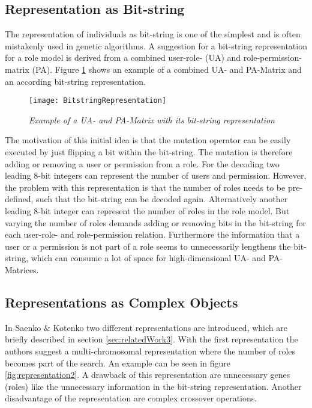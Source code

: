         \subsection{Representation as Bit-string}
        The representation of individuals as bit-string is one of the simplest and is often mistakenly used in genetic algorithms\cite{Eiben}. A suggestion for a bit-string representation for a role model is derived from a combined user-role- (UA) and role-permission-matrix (PA). Figure \ref{fig:representation1} shows an example of a combined UA- and PA-Matrix and an according bit-string representation.
        
        \begin{figure}[H]
            \centering
            \texttt{[image: BitstringRepresentation]}
            \caption{\textit{Example of a UA- and PA-Matrix with its bit-string representation}}
            \label{fig:representation1}
        \end{figure}
        
        The motivation of this initial idea is that the mutation operator can be easily executed by just flipping a bit within the bit-string. The mutation is therefore adding or removing a user or permission from a role. For the decoding two leading 8-bit integers can represent the number of users and permission. However, the problem with this representation is that the number of roles needs to be pre-defined, such that the bit-string can be decoded again. Alternatively another leading 8-bit integer can represent the number of roles in the role model. But varying the number of roles demands adding or removing bits in the bit-string for each user-role- and role-permission relation. Furthermore the information that a user or a permission is not part of a role seems to unnecessarily lengthens the bit-string, which can consume a lot of space for high-dimensional UA- and PA-Matrices.
        
        \subsection{Representations as Complex Objects}
        In Saenko \& Kotenko\cite{saenko2012design} two different representations are introduced, which are briefly described in section \ref{sec:relatedWork3}. With the first representation the authors suggest a multi-chromosomal representation where the number of roles becomes part of the search. An example can be seen in figure \ref{fig:representation2}. A drawback of this representation are unnecessary genes (roles) like the unnecessary information in the bit-string representation. Another disadvantage of the representation are complex crossover operations\cite{saenko2012design}.
        

